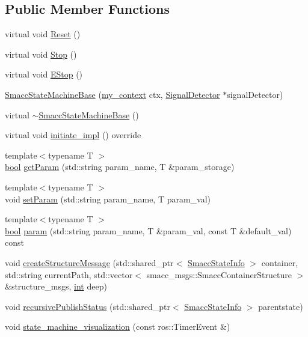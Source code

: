 \subsection*{Public Member Functions}
\begin{DoxyCompactItemize}
\item 
virtual void \hyperlink{structsmacc_1_1SmaccStateMachineBase_a2a99445921298d807eacc7a930a3cb5b}{Reset} ()
\item 
virtual void \hyperlink{structsmacc_1_1SmaccStateMachineBase_abdc1d3f9ae33ba594bc90e158b0a9254}{Stop} ()
\item 
virtual void \hyperlink{structsmacc_1_1SmaccStateMachineBase_aa585d63332b29a61555468874b49aad3}{E\+Stop} ()
\item 
\hyperlink{structsmacc_1_1SmaccStateMachineBase_a47508a2d301007546d4c70dedd2ade4b}{Smacc\+State\+Machine\+Base} (\hyperlink{common_8h_af2dcacead80d69b96952496fe413bbfe}{my\+\_\+context} ctx, \hyperlink{classsmacc_1_1SignalDetector}{Signal\+Detector} $\ast$signal\+Detector)
\item 
virtual \hyperlink{structsmacc_1_1SmaccStateMachineBase_af08edc30fb749631b5459eb7438129ec}{$\sim$\+Smacc\+State\+Machine\+Base} ()
\item 
virtual void \hyperlink{structsmacc_1_1SmaccStateMachineBase_a2dc1cd9a25b80f00602f1faab9b01e7b}{initiate\+\_\+impl} () override
\item 
{\footnotesize template$<$typename T $>$ }\\\hyperlink{classbool}{bool} \hyperlink{structsmacc_1_1SmaccStateMachineBase_a5529364d7f90edb802221536402e838a}{get\+Param} (std\+::string param\+\_\+name, T \&param\+\_\+storage)
\item 
{\footnotesize template$<$typename T $>$ }\\void \hyperlink{structsmacc_1_1SmaccStateMachineBase_a30d76661005a2bdff68c802cdab42fcf}{set\+Param} (std\+::string param\+\_\+name, T param\+\_\+val)
\item 
{\footnotesize template$<$typename T $>$ }\\\hyperlink{classbool}{bool} \hyperlink{structsmacc_1_1SmaccStateMachineBase_a9a074f2e5be33064796ad6df2d6231b7}{param} (std\+::string param\+\_\+name, T \&param\+\_\+val, const T \&default\+\_\+val) const 
\item 
void \hyperlink{structsmacc_1_1SmaccStateMachineBase_a060a552dce399a974a8e68d498fdfb6b}{create\+Structure\+Message} (std\+::shared\+\_\+ptr$<$ \hyperlink{classsmacc_1_1SmaccStateInfo}{Smacc\+State\+Info} $>$ container, std\+::string current\+Path, std\+::vector$<$ smacc\+\_\+msgs\+::\+Smacc\+Container\+Structure $>$ \&structure\+\_\+msgs, \hyperlink{classint}{int} deep)
\item 
void \hyperlink{structsmacc_1_1SmaccStateMachineBase_a5c078ef0eec2c64ecd9a31b46341b13c}{recursive\+Publish\+Status} (std\+::shared\+\_\+ptr$<$ \hyperlink{classsmacc_1_1SmaccStateInfo}{Smacc\+State\+Info} $>$ parentstate)
\item 
void \hyperlink{structsmacc_1_1SmaccStateMachineBase_afcee04fc4d307b31d7d0fac932d7d90f}{state\+\_\+machine\+\_\+visualization} (const ros\+::\+Timer\+Event \&)
\end{DoxyCompactItemize}
